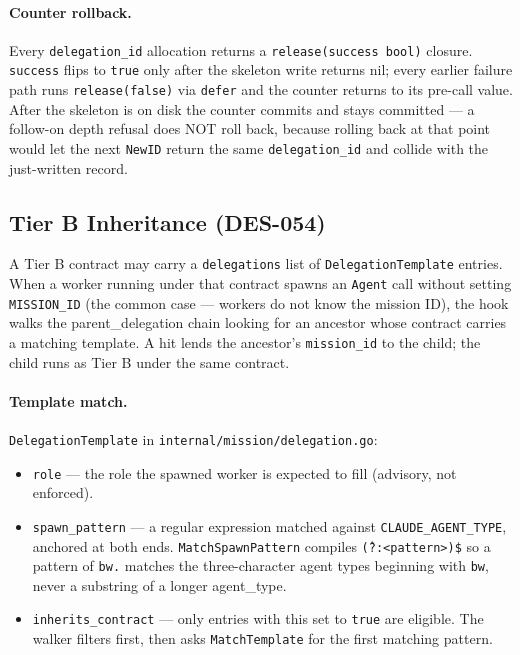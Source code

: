 \documentclass[a4paper,10pt]{article}
\newcommand{\field}[1]{\texttt{#1}}
\newcommand{\fpath}[1]{\texttt{#1}}
\begin{document}
\paragraph{Counter rollback.}  Every \field{delegation\_id}
allocation returns a \texttt{release(success bool)} closure.
\texttt{success} flips to \texttt{true} only after the skeleton
write returns nil; every earlier failure path runs
\texttt{release(false)} via \texttt{defer} and the counter
returns to its pre-call value.  After the skeleton is on disk
the counter commits and stays committed --- a follow-on depth
refusal does NOT roll back, because rolling back at that point
would let the next \texttt{NewID} return the same
\field{delegation\_id} and collide with the just-written record.

\subsection{Tier B Inheritance (DES-054)}
\label{sec:delegation-inheritance}

A Tier B contract may carry a \field{delegations} list of
\texttt{DelegationTemplate} entries.  When a worker running under
that contract spawns an \texttt{Agent} call without setting
\texttt{MISSION\_ID} (the common case --- workers do not know the
mission ID), the hook walks the parent\_delegation chain looking
for an ancestor whose contract carries a matching template.  A
hit lends the ancestor's \field{mission\_id} to the child; the
child runs as Tier B under the same contract.

\paragraph{Template match.}
\texttt{DelegationTemplate} in \fpath{internal/mission/delegation.go}:

\begin{itemize}
  \item \field{role} --- the role the spawned worker is expected
    to fill (advisory, not enforced).
  \item \field{spawn\_pattern} --- a regular expression matched
    against \texttt{CLAUDE\_AGENT\_TYPE}, anchored at both ends.
    \texttt{MatchSpawnPattern} compiles
    \texttt{\^(?:<pattern>)\$} so a pattern of \texttt{bw.}
    matches the three-character agent types beginning with
    \texttt{bw}, never a substring of a longer agent\_type.
  \item \field{inherits\_contract} --- only entries with this set
    to \texttt{true} are eligible.  The walker filters first,
    then asks \texttt{MatchTemplate} for the first matching
    pattern.
\end{itemize}
\end{document}
